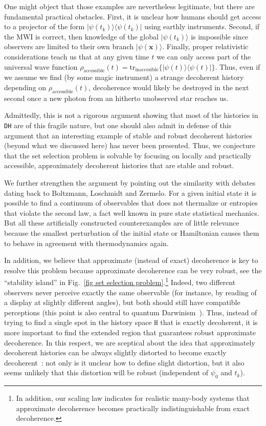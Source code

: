 \documentclass[pre,onecolumn,12pt,aps,longbibliography,nofootinbib]{revtex4-2}
\newcommand{\bb}[1]{\textbf{#1}}
\newcommand{\rl}[0]{{\rangle\langle}}
\newcommand{\blue}[1]{#1}
\begin{document}
One might object that those examples are nevertheless legitimate, but there are fundamental practical obstacles. First, it is unclear how humans should get access to a projector of the form $|\psi(t_k)\rl\psi(t_k)|$ using earthly instruments. Second, \blue{if the MWI is correct, then knowledge of the global $|\psi(t_k)\rangle$ is impossible since observers are limited to their own branch $|\psi(\bb x)\rangle$. Finally,} proper relativistic considerations teach us that at any given time $t$ we can only access part of the universal wave function $\rho_\text{accessible}(t) = \mbox{tr}_\text{inaccesible}\{|\psi(t)\rl\psi(t)|\}$. Thus, even if we assume we find (by some magic instrument) a strange decoherent history depending on $\rho_\text{accessible}(t)$, decoherence would likely be destroyed in the next second once a new photon from an hitherto unobserved star reaches us.

Admittedly, this is not a rigorous argument showing that most of the histories in \texttt{DH} are of this fragile nature, but one should also admit in defense of this argument that an interesting example of stable and robust decoherent histories ({beyond} what we discussed here) has never been presented. Thus, we conjecture that the set selection problem is solvable by focusing on locally and practically accessible, approximately decoherent histories that are stable and robust.

We further strengthen the argument by pointing out the similarity with debates dating back to Boltzmann, Loschmidt and Zermelo. For a given initial state it is possible to find a continuum of observables that does {not} thermalize or entropies that {violate} the second law, a fact well known in pure state statistical mechanics. But all these artificially constructed counterexamples are of little relevance because the smallest perturbation of the initial state or Hamiltonian causes them to behave in agreement with thermodynamics again.

In addition, we believe that {approximate} (instead of exact) decoherence is key to resolve this problem because approximate decoherence can be very robust, see the ``stability island'' in Fig.~\ref{fig set selection problem}.\footnote{In addition, our scaling law indicates for realistic many-body systems that approximate decoherence becomes practically indistinguishable from exact decoherence.} Indeed, two different observers never perceive exactly the same observable (for instance, by reading of a display at slightly different angles), but both should still have compatible perceptions (this point is also central to quantum Darwinism~\cite{ZurekNP2009, KorbiczQuantum2021, ZurekEnt2022}). Thus, instead of trying to find a single spot in the history space $\texttt{H}$ that is exactly decoherent, it is more important to find the extended region that guarantees robust approximate decoherence. In this respect, we are sceptical about the idea that approximately decoherent histories can be always slightly distorted to become exactly decoherent~\cite{DowkerKentPRL1995, DowkerKentJSP1996, HalliwellPRD2001, HalliwellPRA2005}: not only is it unclear how to define slight distortion, but it also seems unlikely that this distortion will be robust (independent of $\psi_0$ and $t_k$).
\end{document}
